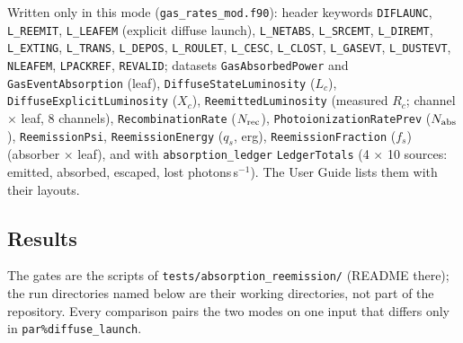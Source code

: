 \documentclass[english,a4paper]{my_memo}
\newcommand{\code}[1]{\texttt{#1}}
\begin{document}
\begin{sloppypar}\noindent
Written only in this mode (\code{gas\_rates\_mod.f90}): header keywords
\code{DIFLAUNC}, \code{L\_REEMIT}, \code{L\_LEAFEM} (explicit diffuse launch),
\code{L\_NETABS}, \code{L\_SRCEMT}, \code{L\_DIREMT}, \code{L\_EXTING},
\code{L\_TRANS}, \code{L\_DEPOS}, \code{L\_ROULET}, \code{L\_CESC},
\code{L\_CLOST}, \code{L\_GASEVT}, \code{L\_DUSTEVT}, \code{NLEAFEM},
\code{LPACKREF}, \code{REVALID}; datasets \code{GasAbsorbedPower} and
\code{GasEventAbsorption} (leaf), \code{DiffuseStateLuminosity} ($L_c$),
\code{DiffuseExplicitLuminosity} ($X_c$), \code{ReemittedLuminosity}
(measured $R_c$; channel $\times$ leaf, 8 channels),
\code{RecombinationRate} ($N_{\rm rec}$), \code{PhotoionizationRatePrev}
($N_{\rm abs}$), \code{ReemissionPsi}, \code{ReemissionEnergy} ($q_s$, erg),
\code{ReemissionFraction} ($f_s$) (absorber $\times$ leaf), and with
\code{absorption\_ledger} \code{LedgerTotals} (4 $\times$ 10 sources:
emitted, absorbed, escaped, lost photons\,s$^{-1}$).  The User Guide lists
them with their layouts.
\end{sloppypar}

\subsection{Results}
\label{sec:reem-results}
The gates are the scripts of \code{tests/absorption\_reemission/}
(README there); the run directories named below are their working
directories, not part of the repository.  Every comparison pairs the two
modes on one input that differs only in \code{par\%diffuse\_launch}.
\end{document}
